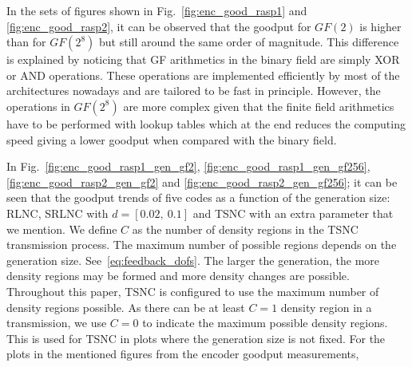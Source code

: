 In the sets of figures shown in Fig.~\ref{fig:enc_good_rasp1} and
\ref{fig:enc_good_rasp2}, it can be observed that the goodput for $GF(2)$
is higher than for $GF(2^8)$ but still around the same order of magnitude.
This difference is explained by noticing that \ac{GF} arithmetics in the
binary field are simply XOR or AND operations. These operations are
implemented efficiently by most of the architectures nowadays and are
tailored to be fast in principle. However, the operations in $GF(2^8)$
are more complex given that the finite field arithmetics have to be
performed with lookup tables which at the end reduces the computing
speed giving a lower goodput when compared with the binary field.

In Fig.~\ref{fig:enc_good_rasp1_gen_gf2}, \ref{fig:enc_good_rasp1_gen_gf256},
\ref{fig:enc_good_rasp2_gen_gf2} and \ref{fig:enc_good_rasp2_gen_gf256};
it can be seen that the goodput trends of five codes as a function of
the generation size: \ac{RLNC}, \ac{SRLNC} with $d = [0.02,\ 0.1]$
and \ac{TSNC} with an extra parameter that we mention. We define
$C$ as the number of density regions in the \ac{TSNC} transmission
process. The maximum number of possible regions depends
on the generation size. See~\eqref{eq:feedback_dofs}.
The larger the generation, the more density regions may
be formed and more density changes are possible.
Throughout this paper, \ac{TSNC} is configured to use the maximum number
of density regions possible. 
As there can be at least $C=1$ density region in a transmission, we use
$C=0$ to indicate the maximum possible density regions. This is
used for \ac{TSNC} in plots where the generation size is not fixed.
%
%
For the plots in the mentioned figures from the encoder goodput measurements,
